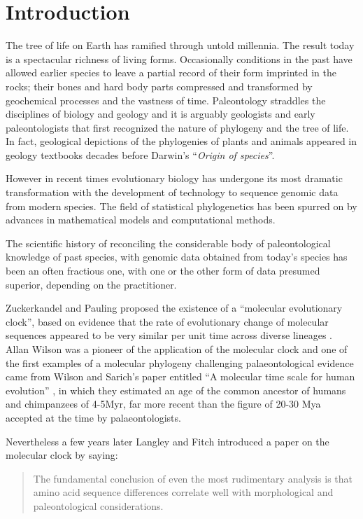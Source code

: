 \section{Introduction} 

The tree of life on Earth has ramified through untold millennia. The result today is a spectacular richness of living forms. Occasionally conditions in the past have allowed earlier species to leave a partial record of their form imprinted in the rocks; their bones and hard body parts compressed and transformed by geochemical processes and the vastness of time. Paleontology straddles the disciplines of biology and geology and it is arguably geologists and early paleontologists that first recognized the nature of phylogeny and the tree of life. In fact, geological depictions of the phylogenies of plants and animals appeared in geology textbooks decades before Darwin's ``{\em Origin of species}''.

However in recent times evolutionary biology has undergone its most dramatic transformation with the development of technology to sequence genomic data from modern species. The field of statistical phylogenetics has been spurred on by advances in mathematical models and computational methods.

The scientific history of reconciling the considerable body of paleontological knowledge of past species, with genomic data obtained from today's species has been an often fractious one, with one or the other form of data presumed superior, depending on the practitioner.

Zuckerkandel and Pauling proposed the existence of a ``molecular evolutionary clock'', based on evidence that the rate of evolutionary change of molecular sequences appeared to be very similar per unit time across diverse lineages \cite{zuckerkandl1965}. Allan Wilson was a pioneer of the application of the molecular clock and one of the first examples of a molecular phylogeny challenging palaeontological evidence came from Wilson and Sarich's paper entitled ``A molecular time scale for human evolution'' \cite{WilsonSarich1969}, in which they estimated an age of the common ancestor of humans and chimpanzees of 4-5Myr, far more recent than the figure of 20-30 Mya accepted at the time by palaeontologists.

Nevertheless a few years later Langley and Fitch \cite{LangleyFitch1974} introduced a paper on the molecular clock by saying:

\begin{quotation}
The fundamental conclusion of even the most rudimentary analysis is that amino acid sequence differences correlate well with morphological and paleontological considerations.
\end{quotation}

